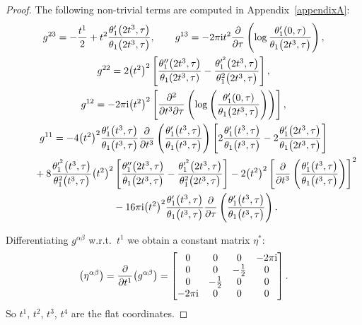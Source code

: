 \documentclass[10pt,a4paper]{amsart}
\numberwithin{equation}{section}
\begin{document}
\begin{proof}
The following non-trivial terms are computed in Appendix~\ref{appendixA}:
\begin{gather}
g^{23}=-\frac{t^1}{2}+t^2\frac{\theta_1^{\prime}\big(2t^3,\tau\big)}{\theta_1\big(2t^3,\tau\big)},
\qquad
g^{13}=-2\pi {\rm i} t^2 \frac{\partial}{\partial \tau}\left(\log\frac{\theta_1^{\prime}(0,\tau)}{\theta_1\big(2t^3,\tau\big)}\right),\nonumber
\\
g^{22}=2\big(t^2\big)^2\left[\frac{\theta_1^{\prime\prime}\big(2t^3,\tau\big)} {\theta_1(2t^3,\tau)}-\frac{\theta_1^{\prime^2}\big(2t^3,\tau\big)} {\theta_1^2\big(2t^3,\tau\big)}\right],\nonumber
\\
g^{12}=-2\pi {\rm i}\big(t^2\big)^2\left[\frac{\partial^2}{\partial t^3\partial \tau}\left( \log\left(\frac{\theta_1^{\prime}(0,\tau)}{\theta_1\big(2t^3,\tau\big)}\right)\right)\right],
\label{g23}
\\
g^{11}=-4\big(t^2\big)^2\frac{\theta_1^{\prime}\big(t^3,\tau\big)}{\theta_1\big(t^3,\tau\big)}\frac{\partial} {\partial t^3}\left(\frac{\theta_1^{\prime}\big(t^3,\tau\big)}{\theta_1\big(t^3,\tau\big)}\right)\left[ 2\frac{\theta_1^{\prime}\big(t^3,\tau\big)}{\theta_1\big(t^3,\tau\big)} -2\frac{\theta_1^{\prime}\big(2t^3,\tau\big)}{\theta_1\big(2t^3,\tau\big)}\right]\nonumber
\\ \hphantom{g^{11}=}
{}+8\frac{\theta_1^{\prime^2}\big(t^3,\tau\big)}{\theta_1^2\big(t^3,\tau\big)}\big(t^2\big)^2 \left[\frac{\theta_1^{\prime\prime}\big(2t^3,\tau\big)}{\theta_1\big(2t^3,\tau\big)} -\frac{\theta_1^{\prime^2}\big(2t^3,\tau\big)}{\theta_1^2\big(2t^3,\tau\big)}\right]
-2\big(t^2\big)^2\left[\frac{\partial}{\partial t^3}\left(\frac{\theta_1^{\prime}\big(t^3,\tau\big)}{\theta_1\big(t^3,\tau\big)}\right)\right]^2\nonumber
\\ \hphantom{g^{11}=}
{}-16\pi {\rm i}\big(t^2\big)^2\frac{\theta_1^{\prime}\big(t^3,\tau\big)}{\theta_1\big(t^3,\tau\big)} \frac{\partial}{\partial \tau}\left(\frac{\theta_1^{\prime}\big(t^3,\tau\big)}{\theta_1\big(t^3,\tau\big)}\right).\label{g11}
\end{gather}

Differentiating $g^{\alpha\beta}$ w.r.t.\ $t^1$ we obtain a constant matrix $\eta^{*}$:
\[
\big(\eta^{\alpha\beta}\big)=\frac{\partial}{\partial t^1}\big(g^{\alpha\beta}\big)=
\begin{bmatrix}
 0 & 0 & 0 &-2\pi {\rm i} \\
 0 & 0 &-\frac{1}{2} &0 \\
 0& -\frac{1}{2} &0 & 0 \\
 -2\pi {\rm i} & 0 & 0 &0
\end{bmatrix}.
\]
So $t^1$, $t^2$, $t^3$, $t^4$ are the flat coordinates.


\end{proof}
\end{document}
